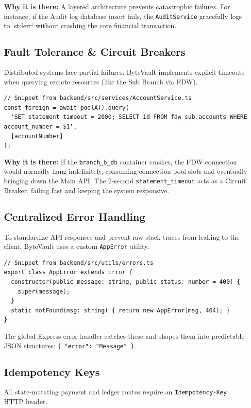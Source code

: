 \textbf{Why it is there:} A layered architecture prevents catastrophic failures. For instance, if the Audit log database insert fails, the \texttt{AuditService} gracefully logs to `stderr` without crashing the core financial transaction. 

\subsection{Fault Tolerance \& Circuit Breakers}
Distributed systems face partial failures. ByteVault implements explicit timeouts when querying remote resources (like the Sub Branch via FDW).

\begin{lstlisting}[style=typescript]
// Snippet from backend/src/services/AccountService.ts
const foreign = await poolA().query(
  'SET statement_timeout = 2000; SELECT id FROM fdw_sub.accounts WHERE account_number = $1',
  [accountNumber]
);
\end{lstlisting}

\textbf{Why it is there:} If the \texttt{branch\_b\_db} container crashes, the FDW connection would normally hang indefinitely, consuming connection pool slots and eventually bringing down the Main API. The 2-second \texttt{statement\_timeout} acts as a Circuit Breaker, failing fast and keeping the system responsive.

\subsection{Centralized Error Handling}
To standardize API responses and prevent raw stack traces from leaking to the client, ByteVault uses a custom \texttt{AppError} utility.

\begin{lstlisting}[style=typescript]
// Snippet from backend/src/utils/errors.ts
export class AppError extends Error {
  constructor(public message: string, public status: number = 400) {
    super(message);
  }
  static notFound(msg: string) { return new AppError(msg, 404); }
}
\end{lstlisting}

The global Express error handler catches these and shapes them into predictable JSON structures: \texttt{\{ "error": "Message" \}}.

\subsection{Idempotency Keys}
All state-mutating payment and ledger routes require an \texttt{Idempotency-Key} HTTP header. 

